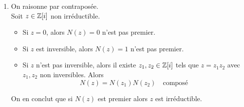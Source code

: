 {\begin{td-sol}[]
\begin{enumerate}
            Conclusion: \(\bb Z[i]\) est un anneau euclidien pour la jauge euclidienne \(v(z) = N(z)\).
            Il est donc principal.

            On a
            \begin{equation*}
                \begin{aligned}
                    \frac{17+4i}{1-i} 
                    &= \frac{(17+4i)(1+i)}{(1-i)(1+i)}\\
                    &= \frac{13+21i}{2}\\
                    &= \frac{13}{2} + \frac{21}{2}i.
                \end{aligned}
            \end{equation*}
            On pose ici \(z' = 6+10i\) et alors
            \begin{equation*}
                \begin{aligned}
                    17 + 4i
                    &= (1-i)(6+10i) + 1.
                \end{aligned}
            \end{equation*}
            où \(1\) joue le rôle du reste.\\
            Comme \(N(1) = 1\) et \(N(1-i) = 2\), on a bien \(N(1) < N(1-i)\)
            et on a bien effectué une division euclidienne.
            \begin{remark}
                Il y a 3 autres divisions euclidiennes possibles
                avec les quotients:
                \begin{equation*}
                    6+11i,\quad 7+10i,\quad 7+11i.
                \end{equation*}
            \end{remark}

            \item On raisonne par contraposée.\\
            Soit \(z\in\mathbb{Z}[i]\) non irréductible.\\
            \begin{itemize}[{\ptr{}}]
                \item Si \(z = 0\), alors \(N(z) = 0\) n'est pas premier.

                \item Si \(z\) est inversible, alors \(N(z) = 1\) n'est pas premier.

                \item Si \(z\) n'est pas inversible, alors il existe \(z_1,z_2\in\mathbb{Z}[i]\)
                tels que \(z = z_1z_2\) avec \(z_1,z_2\) non inversibles. Alors
                \begin{equation*}
                    N(z) = N(z_1)N(z_2)\quad\text{composé}
                \end{equation*}
            \end{itemize}
            On en conclut que si \(N(z)\) est premier alors \(z\) est irréductible.


\end{enumerate}
\end{td-sol}}
